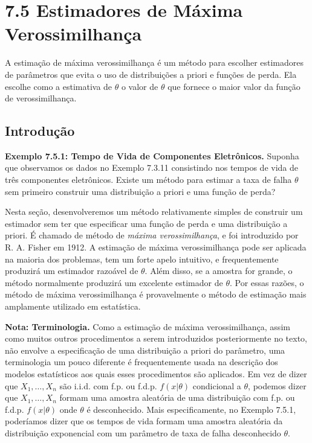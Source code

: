 \section*{7.5 Estimadores de Máxima Verossimilhança}

A estimação de máxima verossimilhança é um método para escolher estimadores de parâmetros que evita o uso de distribuições a priori e funções de perda. Ela escolhe como a estimativa de $\theta$ o valor de $\theta$ que fornece o maior valor da função de verossimilhança.

\subsection*{Introdução}

\textbf{Exemplo 7.5.1: Tempo de Vida de Componentes Eletrônicos.} Suponha que observamos os dados no Exemplo 7.3.11 consistindo nos tempos de vida de três componentes eletrônicos. Existe um método para estimar a taxa de falha $\theta$ sem primeiro construir uma distribuição a priori e uma função de perda?

\vspace{\baselineskip}

Nesta seção, desenvolveremos um método relativamente simples de construir um estimador sem ter que especificar uma função de perda e uma distribuição a priori. É chamado de método de \textit{máxima verossimilhança}, e foi introduzido por R. A. Fisher em 1912. A estimação de máxima verossimilhança pode ser aplicada na maioria dos problemas, tem um forte apelo intuitivo, e frequentemente produzirá um estimador razoável de $\theta$. Além disso, se a amostra for grande, o método normalmente produzirá um excelente estimador de $\theta$. Por essas razões, o método de máxima verossimilhança é provavelmente o método de estimação mais amplamente utilizado em estatística.

\vspace{\baselineskip}

\textbf{Nota: Terminologia.} Como a estimação de máxima verossimilhança, assim como muitos outros procedimentos a serem introduzidos posteriormente no texto, não envolve a especificação de uma distribuição a priori do parâmetro, uma terminologia um pouco diferente é frequentemente usada na descrição dos modelos estatísticos aos quais esses procedimentos são aplicados. Em vez de dizer que $X_1, \dots, X_n$ são i.i.d. com f.p. ou f.d.p. $f(x|\theta)$ condicional a $\theta$, podemos dizer que $X_1, \dots, X_n$ formam uma amostra aleatória de uma distribuição com f.p. ou f.d.p. $f(x|\theta)$ onde $\theta$ é desconhecido. Mais especificamente, no Exemplo 7.5.1, poderíamos dizer que os tempos de vida formam uma amostra aleatória da distribuição exponencial com um parâmetro de taxa de falha desconhecido $\theta$.

